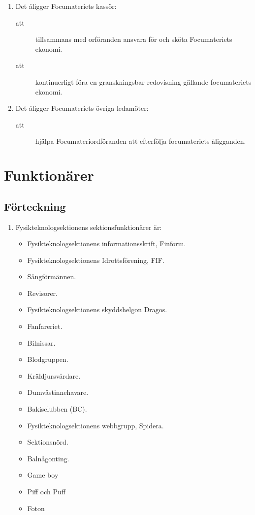 \documentclass[11pt,a4paper]{article}
\begin{document}
\begin{enumerate}[\thesubsection .1]
\begin{description}
    \end{description}


  \item Det åligger Focumateriets kassör:
    \begin{description}
      \item[att] tillsammans med orföranden ansvara för och sköta Focumateriets ekonomi.
      \item[att] kontinuerligt föra en granskningsbar redovisning gällande focumateriets ekonomi.
    \end{description}

  \item Det åligger Focumateriets övriga ledamöter:
    \begin{description}
      \item[att] hjälpa Focumateriordföranden att efterfölja focumateriets åligg\-and\-en.
    \end{description}

\end{enumerate}

\newpage

\section{Funktionärer}

\subsection{Förteckning}

\begin{enumerate}[\thesubsection .1]

  \item Fysikteknologsektionens sektionsfunktionärer är:
    \begin{itemize}
      \item Fysikteknologsektionens informationsskrift, Finform.
      \item Fysikteknologsektionens Idrottsförening, FIF.
      \item Sångförmännen.
      \item Revisorer.
      \item Fysikteknologsektionens skyddshelgon Dragos.
      \item Fanfareriet.
      \item Bilnissar.
      \item Blodgruppen.
      \item Kräldjursvårdare.
      \item Dumvästinnehavare.
      \item Bakisclubben (BC).
      \item Fysikteknologsektionens webbgrupp, Spidera.
      \item Sektionsnörd.
      \item Balnågonting.
      \item Game boy
      \item Piff och Puff 
      \item Foton
    \end{itemize}

\end{enumerate}
\end{document}
